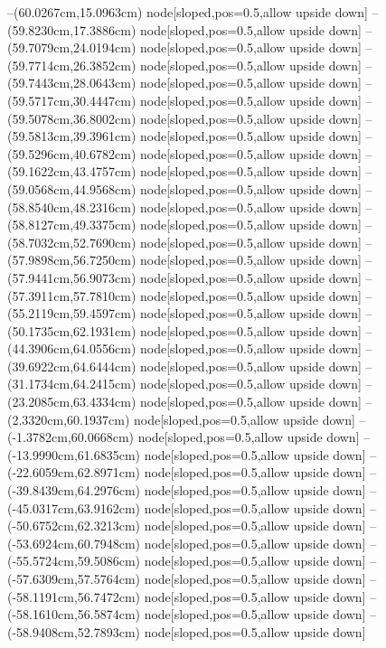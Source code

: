--(60.0267cm,15.0963cm) node[sloped,pos=0.5,allow upside down]{\ArrowIn}
--(59.8230cm,17.3886cm) node[sloped,pos=0.5,allow upside down]{\ArrowIn}
--(59.7079cm,24.0194cm) node[sloped,pos=0.5,allow upside down]{\ArrowIn}
--(59.7714cm,26.3852cm) node[sloped,pos=0.5,allow upside down]{\ArrowIn}
--(59.7443cm,28.0643cm) node[sloped,pos=0.5,allow upside down]{\ArrowIn}
--(59.5717cm,30.4447cm) node[sloped,pos=0.5,allow upside down]{\ArrowIn}
--(59.5078cm,36.8002cm) node[sloped,pos=0.5,allow upside down]{\ArrowIn}
--(59.5813cm,39.3961cm) node[sloped,pos=0.5,allow upside down]{\ArrowIn}
--(59.5296cm,40.6782cm) node[sloped,pos=0.5,allow upside down]{\ArrowIn}
--(59.1622cm,43.4757cm) node[sloped,pos=0.5,allow upside down]{\ArrowIn}
--(59.0568cm,44.9568cm) node[sloped,pos=0.5,allow upside down]{\ArrowIn}
--(58.8540cm,48.2316cm) node[sloped,pos=0.5,allow upside down]{\ArrowIn}
--(58.8127cm,49.3375cm) node[sloped,pos=0.5,allow upside down]{\ArrowIn}
--(58.7032cm,52.7690cm) node[sloped,pos=0.5,allow upside down]{\ArrowIn}
--(57.9898cm,56.7250cm) node[sloped,pos=0.5,allow upside down]{\ArrowIn}
--(57.9441cm,56.9073cm) node[sloped,pos=0.5,allow upside down]{\arrowIn}
--(57.3911cm,57.7810cm) node[sloped,pos=0.5,allow upside down]{\ArrowIn}
--(55.2119cm,59.4597cm) node[sloped,pos=0.5,allow upside down]{\ArrowIn}
--(50.1735cm,62.1931cm) node[sloped,pos=0.5,allow upside down]{\ArrowIn}
--(44.3906cm,64.0556cm) node[sloped,pos=0.5,allow upside down]{\ArrowIn}
--(39.6922cm,64.6444cm) node[sloped,pos=0.5,allow upside down]{\ArrowIn}
--(31.1734cm,64.2415cm) node[sloped,pos=0.5,allow upside down]{\ArrowIn}
--(23.2085cm,63.4334cm) node[sloped,pos=0.5,allow upside down]{\ArrowIn}
--(2.3320cm,60.1937cm) node[sloped,pos=0.5,allow upside down]{\ArrowIn}
--(-1.3782cm,60.0668cm) node[sloped,pos=0.5,allow upside down]{\ArrowIn}
--(-13.9990cm,61.6835cm) node[sloped,pos=0.5,allow upside down]{\ArrowIn}
--(-22.6059cm,62.8971cm) node[sloped,pos=0.5,allow upside down]{\ArrowIn}
--(-39.8439cm,64.2976cm) node[sloped,pos=0.5,allow upside down]{\ArrowIn}
--(-45.0317cm,63.9162cm) node[sloped,pos=0.5,allow upside down]{\ArrowIn}
--(-50.6752cm,62.3213cm) node[sloped,pos=0.5,allow upside down]{\ArrowIn}
--(-53.6924cm,60.7948cm) node[sloped,pos=0.5,allow upside down]{\ArrowIn}
--(-55.5724cm,59.5086cm) node[sloped,pos=0.5,allow upside down]{\ArrowIn}
--(-57.6309cm,57.5764cm) node[sloped,pos=0.5,allow upside down]{\ArrowIn}
--(-58.1191cm,56.7472cm) node[sloped,pos=0.5,allow upside down]{\arrowIn}
--(-58.1610cm,56.5874cm) node[sloped,pos=0.5,allow upside down]{\arrowIn}
--(-58.9408cm,52.7893cm) node[sloped,pos=0.5,allow upside down]{\ArrowIn}
